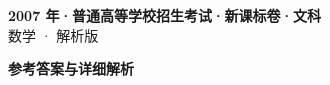 \documentclass[zihao=-4, a4paper]{ctexart}
\begin{document}
\begin{center}
  {\Large\bfseries 2007 年·普通高等学校招生考试·新课标卷·文科}\\[4pt]
  {\large 数学 · 解析版}
\end{center}
\medskip
{}

\clearpage
{}
\begin{center}{\Large\bfseries 参考答案与详细解析}\end{center}
\medskip

\end{document}
